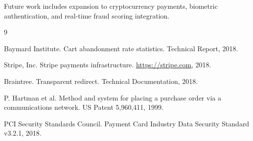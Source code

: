 \documentclass[11pt,a4paper]{article}
\begin{document}
Future work includes expansion to cryptocurrency payments, biometric authentication, and real-time fraud scoring integration.


\begin{thebibliography}{9}

Baymard Institute. Cart abandonment rate statistics. Technical Report, 2018.

Stripe, Inc. Stripe payments infrastructure. \url{https://stripe.com}, 2018.

Braintree. Transparent redirect. Technical Documentation, 2018.

P. Hartman et al. Method and system for placing a purchase order via a communications network. US Patent 5,960,411, 1999.

PCI Security Standards Council. Payment Card Industry Data Security Standard v3.2.1, 2018.

\end{thebibliography}
\end{document}
